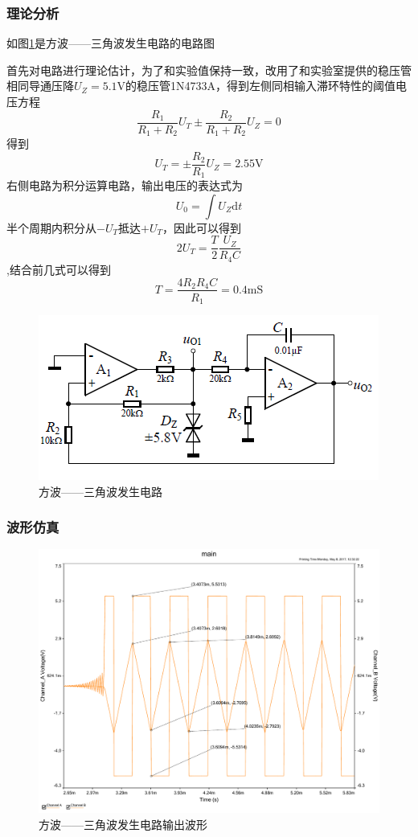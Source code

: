 \documentclass[UTF8,a4paper]{paper}
\begin{document}
\subsubsection{理论分析}
\label{sec:}
\begin{multicols}{2}
如图\ref{BICirc}是方波——三角波发生电路的电路图

首先对电路进行理论估计，为了和实验值保持一致，改用了和实验室提供的稳压管相同导通压降$U_Z=5.1\mathrm{V}$的稳压管1N4733A，得到左侧同相输入滞环特性的阈值电压方程
$$\frac{R_1}{R_1+R_2}U_T\pm\frac{R_2}{R_1+R_2}U_Z=0$$
得到
$$U_T=\pm\frac{R_2}{R_1}U_Z=2.55\mathrm{V}$$
右侧电路为积分运算电路，输出电压的表达式为
$$U_0=\int U_Z\mathrm{d}t$$半个周期内积分从$-U_T$抵达$+U_T$，因此可以得到$$2U_T=\frac{T}{2}\frac{U_Z}{R_4C}$$,结合前几式可以得到$$T=\frac{4R_2R_4C}{R_1}=0.4\mathrm{mS}$$
\begin {figure}[H]
\includegraphics [width=\columnwidth]{bi.png}
\caption{方波——三角波发生电路}
\label{BICirc}
\end {figure}
\end{multicols}
\subsubsection{波形仿真}
\begin{figure}
\centering
\includegraphics[width=\textwidth]{bi.pdf}
\caption{方波——三角波发生电路输出波形}
\label{BI}
\end{figure}
\end{document}
